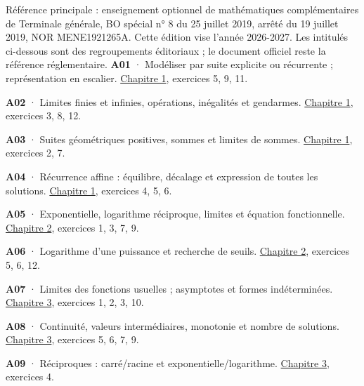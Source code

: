 
\label{concordance}
Référence principale : enseignement optionnel de mathématiques complémentaires de Terminale générale, BO spécial n° 8 du 25 juillet 2019, arrêté du 19 juillet 2019, NOR MENE1921265A. Cette édition vise l'année 2026-2027.
Les intitulés ci-dessous sont des regroupements éditoriaux ; le document officiel reste la référence réglementaire.
\noindent\textbf{A01} · Modéliser par suite explicite ou récurrente ; représentation en escalier. \hyperref[chap-1]{Chapitre 1}, exercices 5, 9, 11.\par\vspace{1.6mm}
\noindent\textbf{A02} · Limites finies et infinies, opérations, inégalités et gendarmes. \hyperref[chap-1]{Chapitre 1}, exercices 3, 8, 12.\par\vspace{1.6mm}
\noindent\textbf{A03} · Suites géométriques positives, sommes et limites de sommes. \hyperref[chap-1]{Chapitre 1}, exercices 2, 7.\par\vspace{1.6mm}
\noindent\textbf{A04} · Récurrence affine : équilibre, décalage et expression de toutes les solutions. \hyperref[chap-1]{Chapitre 1}, exercices 4, 5, 6.\par\vspace{1.6mm}
\noindent\textbf{A05} · Exponentielle, logarithme réciproque, limites et équation fonctionnelle. \hyperref[chap-2]{Chapitre 2}, exercices 1, 3, 7, 9.\par\vspace{1.6mm}
\noindent\textbf{A06} · Logarithme d’une puissance et recherche de seuils. \hyperref[chap-2]{Chapitre 2}, exercices 5, 6, 12.\par\vspace{1.6mm}
\noindent\textbf{A07} · Limites des fonctions usuelles ; asymptotes et formes indéterminées. \hyperref[chap-3]{Chapitre 3}, exercices 1, 2, 3, 10.\par\vspace{1.6mm}
\noindent\textbf{A08} · Continuité, valeurs intermédiaires, monotonie et nombre de solutions. \hyperref[chap-3]{Chapitre 3}, exercices 5, 6, 7, 9.\par\vspace{1.6mm}
\noindent\textbf{A09} · Réciproques : carré/racine et exponentielle/logarithme. \hyperref[chap-3]{Chapitre 3}, exercices 4.\par\vspace{1.6mm}
